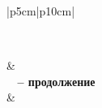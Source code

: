 \begin{longtable}{|p{5cm}|p{10cm}|}
 \caption[Компонетны модели Menta 0.3]{Компонетны модели Menta 0.3}\label{ModulesMenta03} \\ 
 \hline
 
  &   \\ \hline 
\endfirsthead
{}%
{{\bfseries \tablename\ \thetable{} -- продолжение}} \\
\hline {} &
  \\ \hline 
\endhead

\hline {} \\ \hline
\endfoot


\end{longtable}
